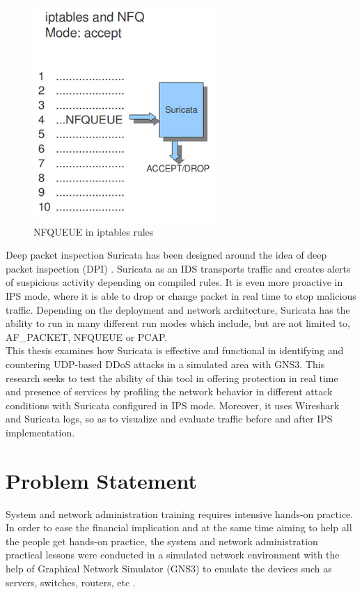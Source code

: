 \begin{figure}[!htb]
    \centering
    \includegraphics[scale=0.6]{thesis/suricataMode.png}
    \caption{NFQUEUE in iptables rules}
    \label{fig:enter-label}
\end{figure}
\newline
Deep packet inspection Suricata has been designed around the idea of deep packet inspection (DPI) \cite{chandramouli2025advanced}. Suricata as an IDS transports traffic and creates alerts of suspicious activity depending on compiled rules. It is even more proactive in IPS mode, where it is able to drop or change packet in real time to stop malicious traffic. Depending on the deployment and network architecture, Suricata has the ability to run in many different run modes which include, but are not limited to, AF\_PACKET, NFQUEUE or PCAP.
\\
This thesis examines how Suricata is effective and functional in identifying and countering UDP-based DDoS attacks in a simulated area with GNS3. This research seeks to test the ability of this tool in offering protection in real time and presence of services by profiling the network behavior in different attack conditions with Suricata configured in IPS mode. Moreover, it uses Wireshark and Suricata logs, so as to visualize and evaluate traffic before and after IPS implementation.
\section{Problem Statement}
System and network administration training requires intensive hands-on practice. In order to ease the financial implication and at the same time aiming to help all the people get hands-on practice, the system and network administration practical lessons were conducted in a simulated network environment with the help of Graphical Network Simulator (GNS3) to emulate the devices such as servers, switches, routers, etc \cite{azem2024network}.
